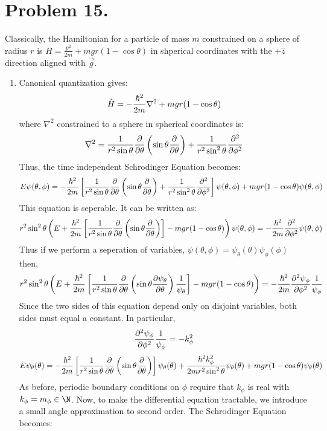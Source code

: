 \documentclass[12pt]{extarticle}
\begin{document}
\section*{Problem 15.}

Classically, the Hamiltonian for a particle of mass $m$ constrained on a sphere of radius $r$ is  $H = \frac{p^2}{2m} + mgr(1 - \cos{\theta})$ in shperical coordinates with the $+ \hat{z}$ direction aligned with $\vec{g}$. 
\begin{enumerate}
\item Canonical quantization gives: \[\hat{H} = -\frac{\hbar^2}{2m} \nabla^2 + mgr(1 - \cos{\theta})\] where $\nabla^2$ constrained to a sphere in spherical coordinates is:
\[\nabla^2 = \frac{1}{r^2 \sin{\theta}} \frac{\partial{}}{\partial{\theta}} \left( \sin{\theta} \frac{\partial{}}{\partial{\theta}} \right) + \frac{1}{r^2 \sin^2{\theta}} \frac{\partial^2{}}{\partial{\phi}^2}\] Thus, the time independent Schrodinger Equation becomes:
\[E \psi(\theta, \phi) = -\frac{\hbar^2}{2m}  \left[ \frac{1}{r^2 \sin{\theta}} \frac{\partial{}}{\partial{\theta}} \left( \sin{\theta} \frac{\partial{}}{\partial{\theta}} \right) + \frac{1}{r^2 \sin^2{\theta}} \frac{\partial^2{}}{\partial{\phi}^2} \right] \psi(\theta, \phi) + mgr(1 - \cos{\theta}) \psi(\theta, \phi) \]
This equation is seperable. It can be written as:
\[ r^2 \sin^2{\theta} \left( E + \frac{\hbar^2}{2m}  \left[ \frac{1}{r^2 \sin{\theta}} \frac{\partial{}}{\partial{\theta}} \left( \sin{\theta} \frac{\partial{}}{\partial{\theta}} \right) \right] - mgr(1 - \cos{\theta}) \right) \psi(\theta, \phi) =  - \frac{\hbar^2}{2m} \frac{\partial^2{}}{\partial{\phi}^2} \psi(\theta, \phi) \]
Thus if we perform a seperation of variables, $\psi(\theta, \phi) = \psi_\theta(\theta) \psi_\phi(\phi)$ then,
\[ r^2 \sin^2{\theta} \left( E + \frac{\hbar^2}{2m}  \left[ \frac{1}{r^2 \sin{\theta}} \frac{\partial{}}{\partial{\theta}} \left( \sin{\theta} \frac{\partial{\psi_\theta}}{\partial{\theta}} \right) \frac{1}{\psi_\theta} \right] - mgr(1 - \cos{\theta}) \right) =  - \frac{\hbar^2}{2m} \frac{\partial^2{\psi_{\phi}}}{\partial{\phi}^2} \frac{1}{\psi_{\phi}} \]
Since the two sides of this equation depend only on disjoint variables, both sides must equal a constant. In particular, 
\[\frac{\partial^2{\psi_{\phi}}}{\partial{\phi}^2} \frac{1}{\psi_{\phi}} = -k_\phi^2 \]
\[E \psi_\theta(\theta) = -\frac{\hbar^2}{2m}  \left[ \frac{1}{r^2 \sin{\theta}} \frac{\partial{}}{\partial{\theta}} \left( \sin{\theta} \frac{\partial{}}{\partial{\theta}} \right) \right] \psi_\theta(\theta) + \frac{\hbar^2 k_\phi^2}{2m r^2 \sin^2{\theta}} \psi_\theta(\theta) + mgr(1 - \cos{\theta}) \psi_\theta(\theta) \]
As before, periodic boundary conditions on $\phi$ require that $k_\phi$ is real with $k_\phi = m_\phi \in \N$. Now, to make the differential equation tractable, we introduce a small angle approximation to second order. The Schrodinger Equation becomes: 

\end{enumerate}
\end{document}
